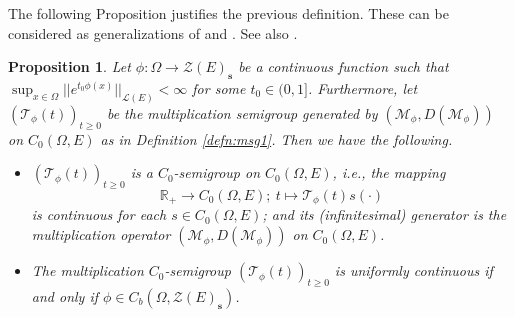 \documentclass{article}
\newtheorem{prop}[equation]{Proposition}
\newcommand{\Bm}[1]{ \boldsymbol{ #1 }}
\newcommand{\R}{\mathbb{R}}
\newcommand{\sL}{\mathscr{L}}
\newcommand{\mZ}{\mathcal{Z}}
\newcommand{\mM}{\mathcal{M}}
\newcommand{\mT}{\mathcal{T}}
\newcommand{\ty}{\infty}
\newcommand{\cd}{\cdot}
\newcommand{\lo}{\longrightarrow}
\newcommand{\Om}{\Omega}
\newcommand{\mt}{\mapsto}
\newcommand{\bei}{\begin{itemize}}
\newcommand{\eei}{\end{itemize}}
\begin{document}
The following Proposition justifies the previous definition. These can be considered as generalizations of  \cite[Proposition 3.4, p.23]{engel2006short} and  \cite[Proposition 3.5, p.23-24]{engel2006short}. See also \cite[Lemma 2.8, p.50]{engel2006short}.

\begin{prop}\label{prop:msg1}
	Let $\phi : \Om \lo  \Bm{\mZ}(E)_\textbf{s}$ be a continuous function such that  $\sup_{x\in\Om}||e^{t_0\phi(x)}||_{\sL(E)}<\ty$ for some $t_0\in(0,1]$. Furthermore, let $(\mT_\phi(t))_{t\ge 0}$ be the multiplication semigroup generated by $(\mM_\phi,  D(\mM_\phi)  )$ on $C_0(\Om, E)$ as in Definition \ref{defn:msg1}. Then we have the following.
	
	\bei
	\item[(i)] $(\mT_\phi(t))_{t\ge 0}$ is a $C_0$-semigroup on $C_0(\Om, E)$, i.e., the mapping 
	\[  \R_+ \lo C_0(\Om, E);\ t \mt \mT_\phi(t)s(\cd)  \]
	is continuous  for each $s\in C_0(\Om, E)$; and its (infinitesimal) generator is the multiplication operator $(\mM_\phi,  D(\mM_\phi)  )$ on $C_0(\Om, E)$.
	
	\item[(ii)] The multiplication $C_0$-semigroup $(\mT_\phi(t))_{t\ge 0}$ is uniformly continuous if and only if $\phi\in C_b(\Om, \Bm{\mZ}(E)_\textbf{s})$.
	\eei
\end{prop}
\end{document}
